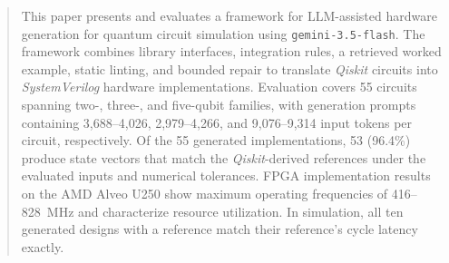 \documentclass[conference]{IEEEtran}
\begin{document}
\maketitle
\begin{abstract}

This paper presents and evaluates a framework for LLM-assisted hardware generation for quantum circuit simulation using \texttt{gemini-3.5-flash}. The framework combines library interfaces, integration rules, a retrieved worked example, static linting, and bounded repair to translate \textit{Qiskit} circuits into \textit{SystemVerilog} hardware implementations. Evaluation covers 55 circuits spanning two-, three-, and five-qubit families, with generation prompts containing 3,688--4,026, 2,979--4,266, and 9,076--9,314 input tokens per circuit, respectively. Of the 55 generated implementations, 53 (96.4\%) produce state vectors that match the \textit{Qiskit}-derived references under the evaluated inputs and numerical tolerances. FPGA implementation results on the AMD Alveo U250 show maximum operating frequencies of 416--828~MHz and characterize resource utilization. In simulation, all ten generated designs with a reference match their reference's cycle latency exactly. \vspace{8pt}



\end{abstract}
\end{document}
